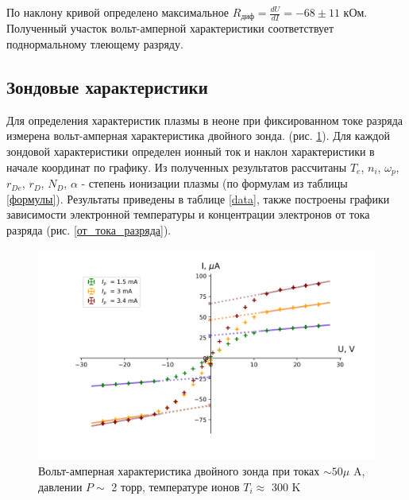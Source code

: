 \documentclass[a4paper,12pt]{article} %
\begin{document}
По наклону кривой определено максимальное $R_{диф}=\frac{dU}{dI} = -68 \pm 11$ кОм. Полученный участок вольт-амперной характеристики соответствует поднормальному тлеющему разряду.

\subsection{Зондовые характеристики} 
Для определения характеристик плазмы в неоне при фиксированном токе разряда измерена вольт-амперная характеристика двойного зонда. (рис. \ref{ВАХ_зонда}). Для каждой зондовой характеристики определен ионный ток и наклон характеристики в начале координат по графику. Из полученных результатов рассчитаны $T_e$, $n_i$, $\omega_p$, $r_{De}$, $r_D$, $N_D$, $\alpha$ - степень ионизации плазмы (по формулам из таблицы \ref{формулы}). Результаты приведены в таблице \ref{data}, также построены графики зависимости 
электронной температуры и концентрации электронов от тока разряда (рис. \ref{от_тока_разряда}).

\begin{figure}[h!]
\begin{center}
\includegraphics[width=\textwidth]{I(U)_probe}
\caption{Вольт-амперная характеристика двойного зонда при токах $\sim 50 \mu $ A, давлении $P \sim$ 2 торр, температуре ионов $T_i \approx $ 300 K} \label{ВАХ_зонда}
\end{center}
\end{figure}
\end{document}
